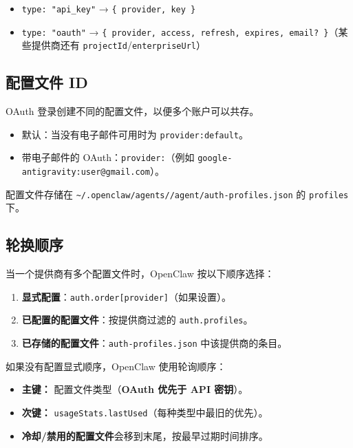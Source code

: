 \begin{itemize}
  \item \texttt{type: "api\_key"} → \texttt{\{ provider, key \}}
  \item \texttt{type: "oauth"} → \texttt{\{ provider, access, refresh, expires, email? \}}（某些提供商还有 \texttt{projectId}/\texttt{enterpriseUrl}）
\end{itemize}


\subsection{配置文件 ID}


OAuth 登录创建不同的配置文件，以便多个账户可以共存。

\begin{itemize}
  \item 默认：当没有电子邮件可用时为 \texttt{provider:default}。
  \item 带电子邮件的 OAuth：\texttt{provider:}（例如 \texttt{google-antigravity:user@gmail.com}）。
\end{itemize}


配置文件存储在 \texttt{\textasciitilde{}/.openclaw/agents//agent/auth-profiles.json} 的 \texttt{profiles} 下。

\subsection{轮换顺序}


当一个提供商有多个配置文件时，OpenClaw 按以下顺序选择：

\begin{enumerate}
  \item \textbf{显式配置}：\texttt{auth.order[provider]}（如果设置）。
  \item \textbf{已配置的配置文件}：按提供商过滤的 \texttt{auth.profiles}。
  \item \textbf{已存储的配置文件}：\texttt{auth-profiles.json} 中该提供商的条目。
\end{enumerate}


如果没有配置显式顺序，OpenClaw 使用轮询顺序：

\begin{itemize}
  \item \textbf{主键：} 配置文件类型（\textbf{OAuth 优先于 API 密钥}）。
  \item \textbf{次键：} \texttt{usageStats.lastUsed}（每种类型中最旧的优先）。
  \item \textbf{冷却/禁用的配置文件}会移到末尾，按最早过期时间排序。
\end{itemize}


